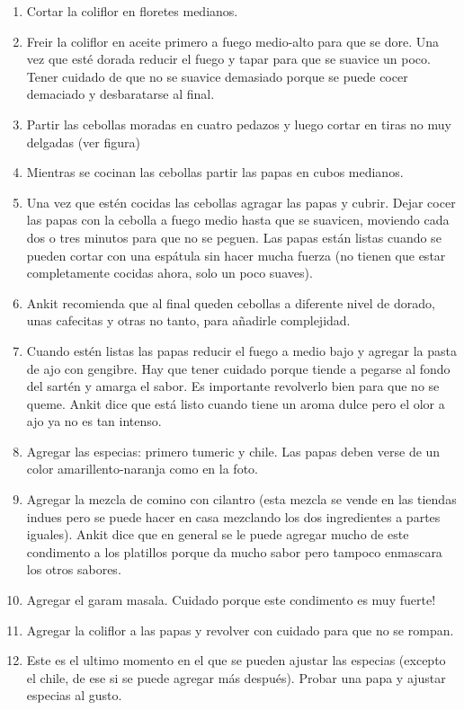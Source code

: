 \begin{enumerate}
\item Cortar la coliflor en floretes medianos.
\item Freir la coliflor en aceite primero a fuego medio-alto para que se dore. Una vez que est\'e dorada reducir el fuego y tapar para que se suavice un poco. Tener cuidado de que no se suavice demasiado porque se puede cocer demaciado y desbaratarse al final. 
\item Partir las cebollas moradas en cuatro pedazos y luego cortar en tiras no muy delgadas (ver figura)
\item Mientras se cocinan las cebollas partir las papas en cubos medianos. 
\item Una vez que est\'en cocidas las cebollas agragar las papas y cubrir. Dejar cocer las papas con la cebolla a fuego medio hasta que se suavicen, moviendo cada dos o tres minutos para que no se peguen. Las papas est\'an listas cuando se pueden cortar con una esp\'atula sin hacer mucha fuerza (no tienen que estar completamente cocidas ahora, solo un poco suaves).
\item Ankit recomienda que al final queden cebollas a diferente nivel de dorado, unas cafecitas y otras no tanto, para añadirle complejidad.
\item Cuando est\'en listas las papas reducir el fuego a medio bajo y agregar la pasta de ajo con gengibre. Hay que tener cuidado porque tiende a pegarse al fondo del sart\'en y amarga el sabor. Es importante revolverlo bien para que no se queme. Ankit dice que est\'a listo cuando tiene un aroma dulce pero el olor a ajo ya no es tan intenso.
\item Agregar las especias: primero tumeric y chile. Las papas deben verse de un color amarillento-naranja como en la foto. 
\item Agregar la mezcla de comino con cilantro (esta mezcla se vende en las tiendas indues pero se puede hacer en casa mezclando los dos ingredientes a partes iguales). Ankit dice que en general se le puede agregar mucho de este condimento a los platillos porque da mucho sabor pero tampoco enmascara los otros sabores. 
\item Agregar el garam masala. Cuidado porque este condimento es muy fuerte! 
\item Agregar la coliflor a las papas y revolver con cuidado para que no se rompan. 
\item Este es el ultimo momento en el que se pueden ajustar las especias (excepto el chile, de ese si se puede agregar m\'as despu\'es). Probar una papa y ajustar especias al gusto. 

\end{enumerate}
